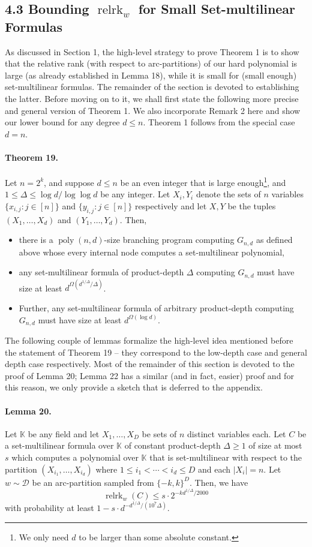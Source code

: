 \subsection*{4.3 Bounding $\operatorname{relrk}_w$ for Small Set-multilinear Formulas}
As discussed in Section 1, the high-level strategy to prove Theorem 1 is to show that the relative rank (with respect to arc-partitions) of our hard polynomial is large (as already established in Lemma 18), while it is small for (small enough) set-multilinear formulas. The remainder of the section is devoted to establishing the latter. Before moving on to it, we shall first state the following more precise and general version of Theorem 1. We also incorporate Remark 2 here and show our lower bound for any degree $d\leq n$. Theorem 1 follows from the special case $d=n$.
\paragraph{Theorem 19.} Let $n=2^k$, and suppose $d\leq n$ be an even integer that is large enough\footnote{We only need $d$ to be larger than some absolute constant.}, and $1\leq\Delta\leq\log d/\log\log d$ be any integer. Let $X_i,Y_i$ denote the sets of $n$ variables $\{x_{i,j}:j\in[n]\}$ and $\{y_{i,j}:j\in[n]\}$ respectively and let $X,Y$ be the tuples $(X_1,\ldots,X_d)$ and $(Y_1,\ldots,Y_d)$. Then,
\begin{itemize}
\item there is a $\operatorname{poly}(n,d)$-size branching program computing $G_{n,d}$ as defined above whose every internal node computes a set-multilinear polynomial,
\item any set-multilinear formula of product-depth $\Delta$ computing $G_{n,d}$ must have size at least $d^{\Omega(d^{1/\Delta}/\Delta)}$.
\item Further, any set-multilinear formula of arbitrary product-depth computing $G_{n,d}$ must have size at least $d^{\Omega(\log d)}$.
\end{itemize}
The following couple of lemmas formalize the high-level idea mentioned before the statement of Theorem 19 -- they correspond to the low-depth case and general depth case respectively. Most of the remainder of this section is devoted to the proof of Lemma 20; Lemma 22 has a similar (and in fact, easier) proof and for this reason, we only provide a sketch that is deferred to the appendix.
\paragraph{Lemma 20.} Let $\mathbb K$ be any field and let $X_1,\ldots,X_D$ be sets of $n$ distinct variables each. Let $C$ be a set-multilinear formula over $\mathbb K$ of constant product-depth $\Delta\geq1$ of size at most $s$ which computes a polynomial over $\mathbb K$ that is set-multilinear with respect to the partition $(X_{i_1},\ldots,X_{i_d})$ where $1\leq i_1<\cdots<i_d\leq D$ and each $|X_i|=n$. Let $w\sim\mathcal D$ be an arc-partition sampled from $\{-k,k\}^D$. Then, we have
\[\operatorname{relrk}_w(C)\leq s\cdot2^{-kd^{1/\Delta}/2000}\]
with probability at least $1-s\cdot d^{-d^{1/\Delta}/(10^7\Delta)}$.
